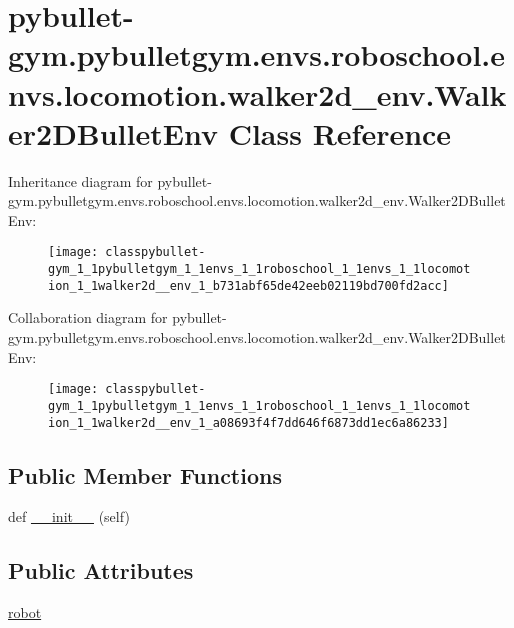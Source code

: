 \hypertarget{classpybullet-gym_1_1pybulletgym_1_1envs_1_1roboschool_1_1envs_1_1locomotion_1_1walker2d__env_1_1_walker2_d_bullet_env}{}\section{pybullet-\/gym.pybulletgym.\+envs.\+roboschool.\+envs.\+locomotion.\+walker2d\+\_\+env.\+Walker2\+D\+Bullet\+Env Class Reference}
\label{classpybullet-gym_1_1pybulletgym_1_1envs_1_1roboschool_1_1envs_1_1locomotion_1_1walker2d__env_1_1_walker2_d_bullet_env}


Inheritance diagram for pybullet-\/gym.pybulletgym.\+envs.\+roboschool.\+envs.\+locomotion.\+walker2d\+\_\+env.\+Walker2\+D\+Bullet\+Env\+:
\nopagebreak
\begin{figure}[H]
\begin{center}
\leavevmode
\texttt{[image: classpybullet-gym\_1\_1pybulletgym\_1\_1envs\_1\_1roboschool\_1\_1envs\_1\_1locomotion\_1\_1walker2d\_\_env\_1\_b731abf65de42eeb02119bd700fd2acc]}
\end{center}
\end{figure}


Collaboration diagram for pybullet-\/gym.pybulletgym.\+envs.\+roboschool.\+envs.\+locomotion.\+walker2d\+\_\+env.\+Walker2\+D\+Bullet\+Env\+:
\nopagebreak
\begin{figure}[H]
\begin{center}
\leavevmode
\texttt{[image: classpybullet-gym\_1\_1pybulletgym\_1\_1envs\_1\_1roboschool\_1\_1envs\_1\_1locomotion\_1\_1walker2d\_\_env\_1\_a08693f4f7dd646f6873dd1ec6a86233]}
\end{center}
\end{figure}
\subsection*{Public Member Functions}
\begin{DoxyCompactItemize}
\item 
def \hyperlink{classpybullet-gym_1_1pybulletgym_1_1envs_1_1roboschool_1_1envs_1_1locomotion_1_1walker2d__env_1_1_walker2_d_bullet_env_a1b67e9c7cb5ae907deed7b7a2d7ba9b4}{\+\_\+\+\_\+init\+\_\+\+\_\+} (self)
\end{DoxyCompactItemize}
\subsection*{Public Attributes}
\begin{DoxyCompactItemize}
\item 
\hyperlink{classpybullet-gym_1_1pybulletgym_1_1envs_1_1roboschool_1_1envs_1_1locomotion_1_1walker2d__env_1_1_walker2_d_bullet_env_a733970768724254fb6cc5065bd4562e2}{robot}
\end{DoxyCompactItemize}


